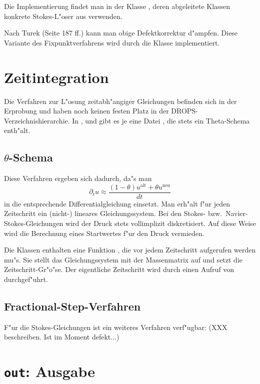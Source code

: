 \documentclass[11pt,a4paper]{article}
\begin{document}
Die Implementierung findet man in der Klasse ,
deren abgeleitete Klassen konkrete Stokes-L"oser aus
 verwenden.

Nach Turek (Seite 187 ff.) kann man obige Defektkorrektur
d"ampfen. Diese Variante des Fixpunktverfahrens wird durch die Klasse
 implementiert.

\section{Zeitintegration}
Die Verfahren zur L"osung zeitabh"angiger Gleichungen befinden
sich in der Erprobung und haben noch keinen festen Platz in der
DROPS-Verzeichnishierarchie.  In ,  und
 gibt es je eine Datei , die stets ein
Theta-Schema enth"alt.

\subsection{$\theta$-Schema}
Diese Verfahren ergeben sich dadurch, da"s man
$$
\partial_t u \approx \frac{(1-\theta) u^\text{alt} + \theta u^\text{neu}}{dt}
$$
in die entsprechende Differentialgleichung einsetzt. Man erh"alt f"ur
jeden Zeitschritt ein (nicht-) lineares Gleichungssystem. Bei den Stokes-
bzw.\ Navier-Stokes-Gleichungen wird der Druck stets vollimplizit
diskretisiert.  Auf diese Weise wird die Berechnung eines Startwertes
f"ur den Druck vermieden.

Die Klassen  enthalten eine Funktion
, die vor jedem Zeitschritt aufgerufen werden mu"s. Sie
stellt das Gleichungssystem mit der Massenmatrix auf und setzt die
Zeitschritt-Gr"o"se.  Der eigentliche Zeitschritt wird durch einen Aufruf
von  durchgef"uhrt.

\subsection{Fractional-Step-Verfahren}
F"ur die Stokes-Gleichungen ist ein weiteres Verfahren verf"ugbar:
(XXX beschreiben. Ist im Moment defekt...)

\section{{\tt out}: Ausgabe}
\end{document}
